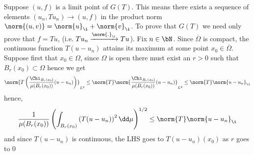 \documentclass{pset}
\begin{document}
\maketitle

\pagebreak 
\begin{problem}[3]
    Suppose $(u, f)$ is a limit point of $G(T)$. This means there exists a sequence of elements $(u_n, Tu_n) \to (u, f)$ in the product norm $\norm{(u, v)} = \norm{u}_\i+\norm{v}_\i$. To prove that $G(T)$ we need only prove that $f=Tu$, (i.e. $Tu_n \xrightarrow{\norm{.}_\i} Tu$). Fix $n\in\bN$. Since $\overline{\Omega}$ is compact, the continuous function $T(u-u_n)$ attains its maximum at some point $x_0\in\overline{\Omega}$. Suppose first that $x_0\in\Omega$, since $\Omega$ is open there must exist an $r>0$ such that $B_r(x_0)\subset \Omega$ hence we get
    \[\norm{T\left(\frac{\Chi_{B_r(x_0)}}{\mu(B_r(x_0))}(u-u_n)\right)}_{L^2} \leq \norm{T}\norm{\frac{\Chi_{B_r(x_0)}}{\mu(B_r(x_0))}(u-u_n)}_{L^2} \leq \norm{T}\norm{u-u_n}_\i\]
    hence,
    \[\frac{1}{\mu(B_r(x_0))} \left(\int_{B_r(x_0)} \left(T(u-u_n)\right)^2 \dd \mu\right)^{1/2}\leq \norm{T}\norm{u-u_n}_\i\]
    and since $T(u-u_n)$ is continuous, the LHS goes to $T(u-u_n)(x_0)$ as $r$ goes to $0$
\end{problem}
\end{document}
